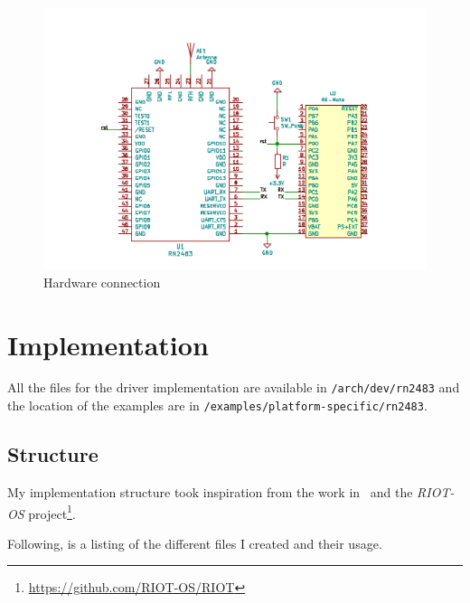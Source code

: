 \begin{figure}[H]
  \centering
  \includegraphics[scale=0.70]{thesis.tex/chapters/driver/fig/conn_diag.pdf}
  \caption{Hardware connection\label{fig:schemaconn}}
\end{figure}

\section{Implementation}

All the files for the driver implementation are available in
\lstinline{/arch/dev/rn2483} and the location of the examples are in
\lstinline{/examples/platform-specific/rn2483}.

\subsection{Structure}

My implementation structure took inspiration from the work 
in~\cite{8847137} and the \emph{RIOT-OS}
project\footnote{\url{https://github.com/RIOT-OS/RIOT}}. 

Following, is a listing of the different files I created and their
usage. %

